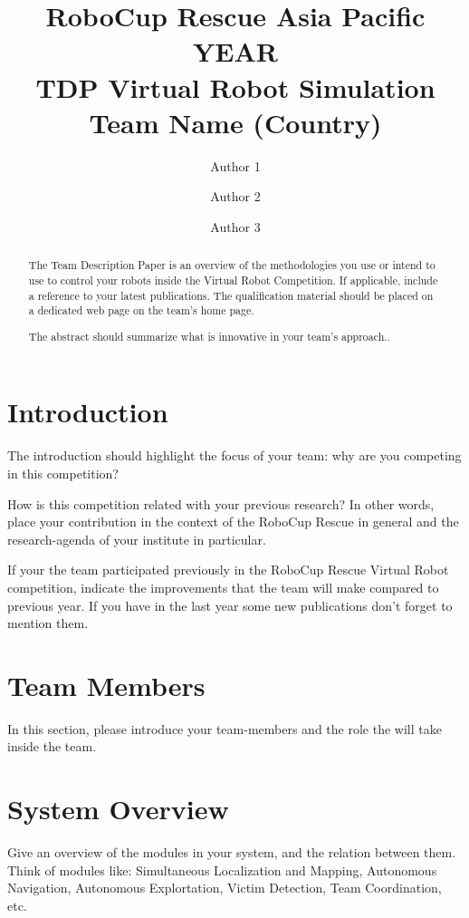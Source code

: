 \documentclass[runningheads,a4paper]{llncs}
\begin{document}
\title{RoboCup Rescue Asia Pacific YEAR\\
       TDP Virtual Robot Simulation\\
       Team Name (Country)}
\author{Author 1 \and Author 2 \and Author 3}
\maketitle
\begin{abstract}
The Team Description Paper is an overview of the methodologies you use or intend to use to control your robots inside the Virtual Robot Competition. If applicable, include a reference to your latest publications. The qualification material should be placed on a dedicated web page on the team's home page.

The abstract should summarize what is innovative in your team's approach..
\end{abstract}
\section{Introduction}
The introduction should highlight the focus of your team: why are you competing in this competition?

How is this competition related with your previous research? In other words, place your contribution in the context of the RoboCup Rescue in general and the research-agenda of your institute in particular.

If your the team participated previously in the RoboCup Rescue Virtual Robot competition, indicate the improvements that the team will make compared to previous year. If you have in the last year some new publications don't forget to mention them.
\section{Team Members}
In this section, please introduce your team-members and the role the will take inside the team.
\section{System Overview}
Give an overview of the modules in your system, and the relation between them. Think of modules like: Simultaneous Localization and Mapping, Autonomous Navigation, Autonomous Explortation, Victim Detection, Team Coordination, etc.
\end{document}
